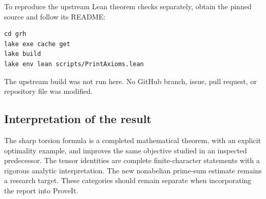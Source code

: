 To reproduce the upstream Lean theorem checks separately, obtain the pinned source and follow its README:
\begin{lstlisting}
cd grh
lake exe cache get
lake build
lake env lean scripts/PrintAxioms.lean
\end{lstlisting}
The upstream build was not run here. No GitHub branch, issue, pull request, or repository file was modified.

\subsection{Interpretation of the result}
The sharp torsion formula is a completed mathematical theorem, with an explicit optimality example, and improves the same objective studied in an inspected predecessor. The tensor identities are complete finite-character statements with a rigorous analytic interpretation. The new nonabelian prime-sum estimate remains a research target. These categories should remain separate when incorporating the report into ProveIt.


